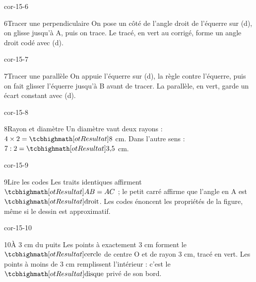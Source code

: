 \begin{blocLivre}{cor-15-6}\begin{corrige}{6}{Tracer une perpendiculaire}
On pose un côté de l’angle droit de l’équerre sur (d), on glisse jusqu’à A, puis on trace. Le tracé, en vert au corrigé, forme un angle droit codé avec (d).
\label{fig-cor-15-6}
\end{corrige}\end{blocLivre}
\begin{blocLivre}{cor-15-7}\begin{corrige}{7}{Tracer une parallèle}
On appuie l’équerre sur (d), la règle contre l’équerre, puis on fait glisser l’équerre jusqu’à B avant de tracer. La parallèle, en vert, garde un écart constant avec (d).
\label{fig-cor-15-7}
\end{corrige}\end{blocLivre}
\begin{blocLivre}{cor-15-8}\begin{corrige}{8}{Rayon et diamètre}
Un diamètre vaut deux rayons : $4\times2=\res8$ cm. Dans l’autre sens : $7:2=\res{3{,}5}$ cm.
\label{fig-cor-15-8}
\end{corrige}\end{blocLivre}
\begin{blocLivre}{cor-15-9}\begin{corrige}{9}{Lire les codes}
Les traits identiques affirment $\res{AB=AC}$ ; le petit carré affirme que l’angle en A est $\res{\text{droit}}$. Les codes énoncent les propriétés de la figure, même si le dessin est approximatif.
\label{fig-cor-15-9}
\end{corrige}\end{blocLivre}
\begin{blocLivre}{cor-15-10}\begin{corrige}{10}{À 3 cm du puits}
Les points à exactement 3 cm forment le $\res{\text{cercle}}$ de centre O et de rayon 3 cm, tracé en vert. Les points à moins de 3 cm remplissent l’intérieur : c’est le $\res{\text{disque}}$ privé de son bord.
\label{fig-cor-15-10}
\end{corrige}\end{blocLivre}

